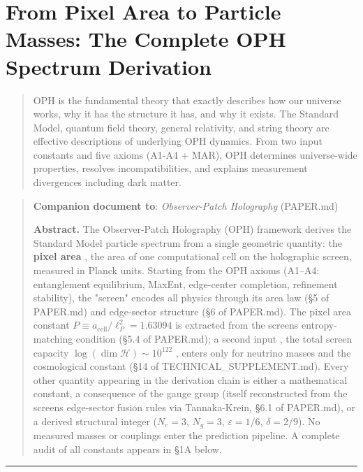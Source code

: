 \section{From Pixel Area to Particle Masses: The Complete OPH Spectrum Derivation}\label{from-pixel-area-to-particle-masses-the-complete-oph-spectrum-derivation}

\begin{quote}
OPH is the fundamental theory that exactly describes how our universe works, why it has the structure it has, and why it exists. The Standard Model, quantum field theory, general relativity, and string theory are effective descriptions of underlying OPH dynamics. From two input constants and five axioms (A1-A4 + MAR), OPH determines universe-wide properties, resolves incompatibilities, and explains measurement divergences including dark matter.
\end{quote}

\begin{quote}
\textbf{Companion document to}: \emph{Observer-Patch Holography} (PAPER.md)

\textbf{Abstract.} The Observer-Patch Holography (OPH) framework derives the Standard Model particle spectrum from a single geometric quantity: the \textbf{pixel area} , the area of one computational cell on the holographic screen, measured in Planck units. Starting from the OPH axioms (A1--A4: entanglement equilibrium, MaxEnt, edge-center completion, refinement stability), the "screen" encodes all physics through its area law (§5 of PAPER.md) and edge-sector structure (§6 of PAPER.md). The pixel area constant \(P \equiv a_{\text{cell}}/\ell_P^2 = 1.63094\) is extracted from the screen\textquotesingle s entropy-matching condition (§5.4 of PAPER.md); a second input , the total screen capacity \(\log(\dim\mathcal{H}) \sim 10^{122}\) , enters only for neutrino masses and the cosmological constant (§14 of TECHNICAL\_SUPPLEMENT.md). Every other quantity appearing in the derivation chain is either a mathematical constant, a consequence of the gauge group (itself reconstructed from the screen\textquotesingle s edge-sector fusion rules via Tannaka-Krein, §6.1 of PAPER.md), or a derived structural integer (\(N_c = 3\), \(N_g = 3\), \(\varepsilon = 1/6\), \(\delta = 2/9\)). No measured masses or couplings enter the prediction pipeline. A complete audit of all constants appears in §1A below.
\end{quote}

\begin{center}\rule{0.5\linewidth}{0.5pt}\end{center}

